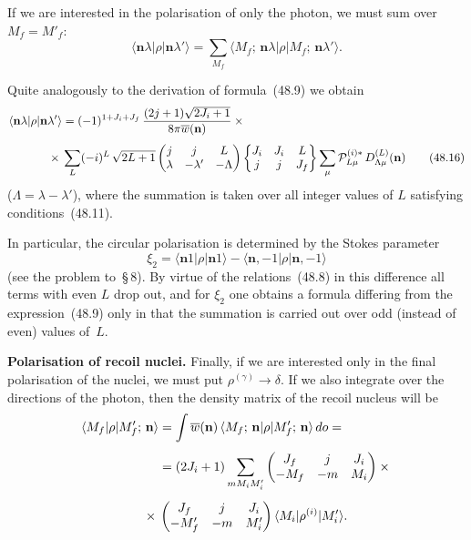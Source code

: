 If we are interested in the polarisation of only the photon, we must sum over $M_f = M'_f$:
\[
\langle\mathbf{n}\lambda|\rho|\mathbf{n}\lambda'\rangle = \sum_{M_f}\langle M_f;\,\mathbf{n}\lambda|\rho|M_f;\,\mathbf{n}\lambda'\rangle.
\]

Quite analogously to the derivation of formula~(48.9) we obtain
\begin{align}
\langle\mathbf{n}\lambda|\rho|\mathbf{n}\lambda'\rangle &= (-1)^{1+J_i+J_f}\,\frac{(2j+1)\sqrt{2J_i+1}}{8\pi\overline{w}(\mathbf{n})}\times{}\notag\\[4pt]
{}\times{}&\sum_L(-i)^L\,\sqrt{2L+1}\begin{pmatrix} j & j & L \\ \lambda & -\lambda' & -\Lambda\end{pmatrix}\begin{Bmatrix} J_i & J_i & L \\ j & j & J_f\end{Bmatrix}\sum_\mu\mathcal{P}^{(i)*}_{L\mu}\,D^{(L)}_{\Lambda\mu}(\mathbf{n})
\tag{48.16}
\end{align}
($\Lambda = \lambda - \lambda'$), where the summation is taken over all integer values of $L$ satisfying conditions~(48.11).

In particular, the circular polarisation is determined by the Stokes parameter
\[
\xi_2 = \langle\mathbf{n}1|\rho|\mathbf{n}1\rangle - \langle\mathbf{n},-1|\rho|\mathbf{n},-1\rangle
\]
(see the problem to~\S\,8). By virtue of the relations~(48.8) in this difference all terms with even $L$ drop out, and for $\xi_2$ one obtains a formula differing from the expression~(48.9) only in that the summation is carried out over odd (instead of even) values of~$L$.

\textbf{Polarisation of recoil nuclei.} Finally, if we are interested only in the final polarisation of the nuclei, we must put $\rho^{(\gamma)} \to \delta$. If we also integrate over the directions of the photon, then the density matrix of the recoil nucleus will be
\begin{align}
\langle M_f|\rho|M'_f;\,\mathbf{n}\rangle &= \int\overline{w}(\mathbf{n})\,\langle M_f;\,\mathbf{n}|\rho|M'_f;\,\mathbf{n}\rangle\,do ={}\notag\\[4pt]
&= (2J_i + 1)\sum_{mM_i M'_i}\begin{pmatrix} J_f & j & J_i \\ -M_f & -m & M_i\end{pmatrix}\times{}\notag\\[4pt]
{}\times{}&\begin{pmatrix} J_f & j & J_i \\ -M'_f & -m & M'_i\end{pmatrix}\langle M_i|\rho^{(i)}|M'_i\rangle.
\end{align}

